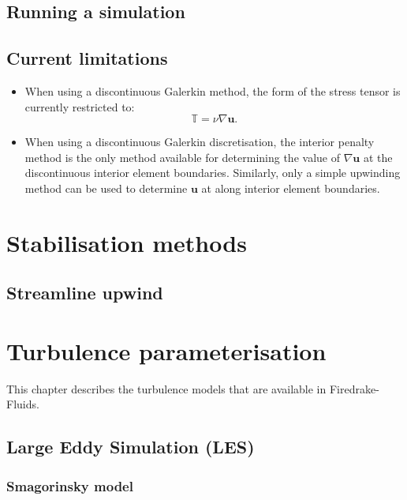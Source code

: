 \documentclass[a4paper,11pt]{report}
\begin{document}
 
\section{Running a simulation}

\section{Current limitations}
\begin{itemize}
   \item When using a discontinuous Galerkin method, the form of the stress tensor is currently restricted to:
   \begin{equation}
      \mathbb{T} = \nu\nabla\mathbf{u}.
   \end{equation}
   \item When using a discontinuous Galerkin discretisation, the interior penalty method is the only method available for determining the value of $\nabla\mathbf{u}$ at the discontinuous interior element boundaries. Similarly, only a simple upwinding method can be used to determine $\mathbf{u}$ at along interior element boundaries.
\end{itemize}

\chapter{Stabilisation methods}\label{chap:stabilisation}

\section{Streamline upwind}


\chapter{Turbulence parameterisation}
This chapter describes the turbulence models that are available in Firedrake-Fluids.

\section{Large Eddy Simulation (LES)}

\subsection{Smagorinsky model}
\end{document}
